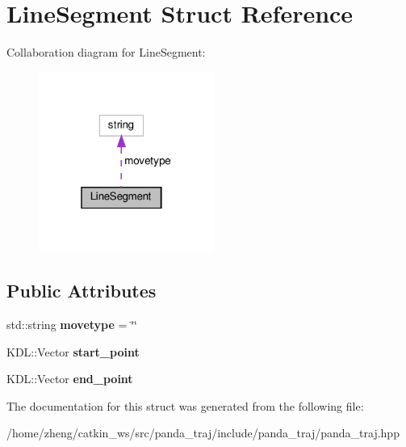 \hypertarget{struct_line_segment}{}\section{Line\+Segment Struct Reference}
\label{struct_line_segment}


Collaboration diagram for Line\+Segment\+:
\nopagebreak
\begin{figure}[H]
\begin{center}
\leavevmode
\includegraphics[width=163pt]{struct_line_segment__coll__graph}
\end{center}
\end{figure}
\subsection*{Public Attributes}
\begin{DoxyCompactItemize}
\item 
\mbox{\label{struct_line_segment_aaf6a14e1ad8dd91c5688c30f39995ee4}} 
std\+::string {\bfseries movetype} = \char`\"{}\char`\"{}
\item 
\mbox{\label{struct_line_segment_a5e2b2580e69a9a72051ad6537c88e631}} 
K\+D\+L\+::\+Vector {\bfseries start\+\_\+point}
\item 
\mbox{\label{struct_line_segment_a2258df78d8bfafc1a5e4761793f9ebdd}} 
K\+D\+L\+::\+Vector {\bfseries end\+\_\+point}
\end{DoxyCompactItemize}


The documentation for this struct was generated from the following file\+:\begin{DoxyCompactItemize}
\item 
/home/zheng/catkin\+\_\+ws/src/panda\+\_\+traj/include/panda\+\_\+traj/panda\+\_\+traj.\+hpp\end{DoxyCompactItemize}
